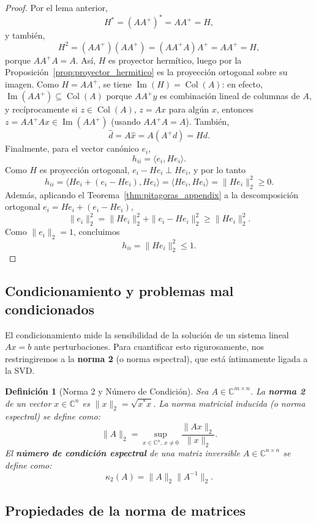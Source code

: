 \documentclass[a4paper,11pt]{report}
\newtheorem{definition}[theorem]{Definición}
\begin{document}
\begin{proof}
Por el lema anterior,
\[
H^*=(AA^+)^*=AA^+=H,
\]
y también,
\[
H^2=(AA^+)(AA^+)=(AA^+A)A^+=AA^+=H,
\]
porque $AA^+A=A$.
Así, $H$ es proyector hermítico, luego por la Proposición~\ref{prop:proyector_hermitico} es la proyección ortogonal sobre su imagen. Como $H=AA^+$, se tiene $\operatorname{Im}(H)=\operatorname{Col}(A)$: en efecto, $\operatorname{Im}(AA^+)\subseteq\operatorname{Col}(A)$ porque $AA^+y$ es combinación lineal de columnas de $A$, y recíprocamente si $z\in\operatorname{Col}(A)$, $z=Ax$ para algún $x$, entonces $z=AA^+Ax\in\operatorname{Im}(AA^+)$ (usando $AA^+A=A$). También,
\[
\hat{d}=A\hat{x}=A(A^+d)=Hd.
\]
Finalmente, para el vector canónico $e_i$,
\[
h_{ii}=\langle e_i,He_i\rangle.
\]
Como $H$ es proyección ortogonal, $e_i-He_i\perp He_i$, y por lo tanto
\[
h_{ii}=\langle He_i+(e_i-He_i),He_i\rangle=\langle He_i,He_i\rangle=\|He_i\|_2^2\ge0.
\]
Además, aplicando el Teorema~\ref{thm:pitagoras_appendix} a la descomposición ortogonal
\(e_i=He_i+(e_i-He_i)\),
\[
\|e_i\|_2^2=\|He_i\|_2^2+\|e_i-He_i\|_2^2\ge \|He_i\|_2^2.
\]
Como $\|e_i\|_2=1$, concluimos
\[
h_{ii}=\|He_i\|_2^2\le 1.
\]
\end{proof}


\subsection{Condicionamiento y problemas mal condicionados}

El condicionamiento mide la sensibilidad de la solución de un sistema lineal $Ax=b$ ante perturbaciones. Para cuantificar esto rigurosamente, nos restringiremos a la \textbf{norma 2} (o norma espectral), que está íntimamente ligada a la SVD.

\begin{definition}[Norma 2 y Número de Condición]\label{def_norma_A}
Sea $A\in\mathbb{C}^{m\times n}$. La \textbf{norma 2} de un vector $x\in\mathbb{C}^n$ es $\|x\|_2 = \sqrt{x^*x}$. La norma matricial inducida (o norma espectral) se define como:
\[
\|A\|_2 = \sup_{x \in\mathbb{C}^n,\, x \neq 0} \frac{\|Ax\|_2}{\|x\|_2}.
\]
El \textbf{número de condición espectral} de una matriz inversible $A\in\mathbb{C}^{n\times n}$ se define como:
\[
\kappa_2(A) = \|A\|_2 \|A^{-1}\|_2.
\]
\end{definition}

\subsection{Propiedades de la norma de matrices}
\end{document}
